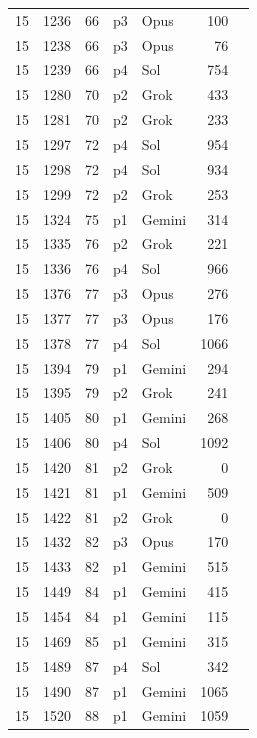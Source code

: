 \begin{longtable}{r r r l l r L{2.3in}}
15 & 1236 & 66 & p3 & Opus & 100 &  \\
15 & 1238 & 66 & p3 & Opus & 76 &  \\
15 & 1239 & 66 & p4 & Sol & 754 &  \\
15 & 1280 & 70 & p2 & Grok & 433 &  \\
15 & 1281 & 70 & p2 & Grok & 233 &  \\
15 & 1297 & 72 & p4 & Sol & 954 &  \\
15 & 1298 & 72 & p4 & Sol & 934 &  \\
15 & 1299 & 72 & p2 & Grok & 253 &  \\
15 & 1324 & 75 & p1 & Gemini & 314 &  \\
15 & 1335 & 76 & p2 & Grok & 221 &  \\
15 & 1336 & 76 & p4 & Sol & 966 &  \\
15 & 1376 & 77 & p3 & Opus & 276 &  \\
15 & 1377 & 77 & p3 & Opus & 176 &  \\
15 & 1378 & 77 & p4 & Sol & 1066 &  \\
15 & 1394 & 79 & p1 & Gemini & 294 &  \\
15 & 1395 & 79 & p2 & Grok & 241 &  \\
15 & 1405 & 80 & p1 & Gemini & 268 &  \\
15 & 1406 & 80 & p4 & Sol & 1092 &  \\
15 & 1420 & 81 & p2 & Grok & 0 &  \\
15 & 1421 & 81 & p1 & Gemini & 509 &  \\
15 & 1422 & 81 & p2 & Grok & 0 &  \\
15 & 1432 & 82 & p3 & Opus & 170 &  \\
15 & 1433 & 82 & p1 & Gemini & 515 &  \\
15 & 1449 & 84 & p1 & Gemini & 415 &  \\
15 & 1454 & 84 & p1 & Gemini & 115 &  \\
15 & 1469 & 85 & p1 & Gemini & 315 &  \\
15 & 1489 & 87 & p4 & Sol & 342 &  \\
15 & 1490 & 87 & p1 & Gemini & 1065 &  \\
15 & 1520 & 88 & p1 & Gemini & 1059 &  \\

\end{longtable}
